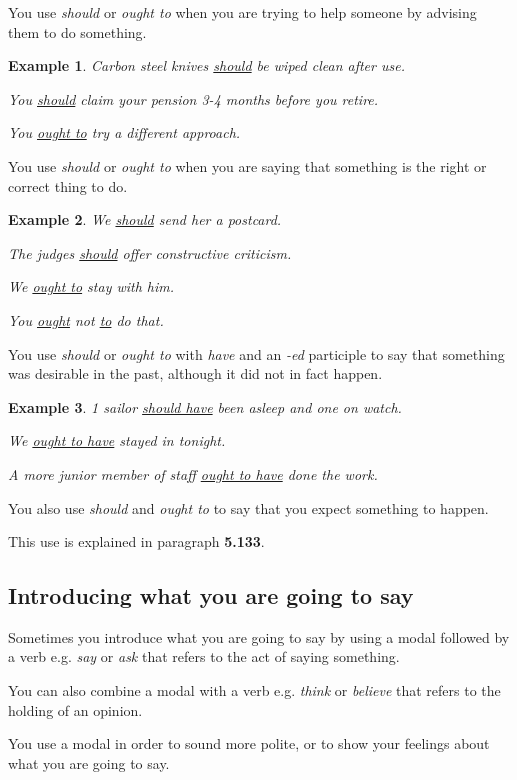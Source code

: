 \documentclass[oneside]{book}
\numberwithin{equation}{section}
\newtheorem{example}{Example}[section]
\begin{document}
%
You use \textit{should} or \textit{ought to} when you are trying to help someone by advising them to do something.
\begin{example}
    Carbon steel knives \underline{should} be wiped clean after use.
    
    You \underline{should} claim your pension 3-4 months before you retire.
    
    You \underline{ought to} try a different approach.
\end{example}
You use \textit{should} or \textit{ought to} when you are saying that something is the right or correct thing to do.
\begin{example}
    We \underline{should} send her a postcard.
    
    The judges \underline{should} offer constructive criticism.
    
    We \underline{ought to} stay with him.
    
    You \underline{ought} not \underline{to} do that.
\end{example}
You use \textit{should} or \textit{ought to} with \textit{have} and an \textit{-ed} participle to say that something was desirable in the past, although it did not in fact happen.
\begin{example}
    1 sailor \underline{should have} been asleep and one on watch.
    
    We \underline{ought to have} stayed in tonight.
    
    A more junior member of staff \underline{ought to have} done the work.
\end{example}
You also use \textit{should} and \textit{ought to} to say that you expect something to happen.

%
This use is explained in paragraph \textbf{5.133}.

\subsection{Introducing what you are going to say}
\noindent{} Sometimes you introduce what you are going to say by using a modal followed by a verb e.g. \textit{say} or \textit{ask} that refers to the act of saying something.

You can also combine a modal with a verb e.g. \textit{think} or \textit{believe} that refers to the holding of an opinion.

%
You use a modal in order to sound more polite, or to show your feelings about what you are going to say.
\end{document}
